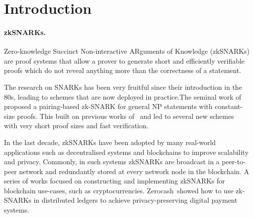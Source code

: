 %
%


\section{Introduction}


\paragraph{zkSNARKs.}

Zero-knowledge Succinct Non-interactive ARguments of Knowledge (zkSNARKs) are  proof systems that allow a prover to generate
short and efficiently verifiable proofs which do not reveal anything more than the correctness of a statement.  

The research on SNARKs has been very fruitful since their introduction in the 80s, leading to schemes that are now deployed in practice.The seminal work of~\cite{EC:GGPR13} proposed a pairing-based zk-SNARK for general NP statements with constant-size proofs. This built on previous works of~\cite{IKO07,AC:Groth10a,TCC:Lipmaa12} and led to several new schemes~\cite{TCC:BCIOP13,SP:PHGR13,C:BCGTV13,AC:Lipmaa13,USENIX:BCTV14,EC:Groth16} with very short proof sizes and fast verification. 

In the last decade, zkSNARKs have been adopted by many real-world applications such as decentralised systems and blockchains to improve scalability and privacy. 
Commonly, in such systems zkSNARKs are broadcast in a peer-to-peer network and redundantly stored at every network node in the blockchain.
A series of works focused on constructing and implementing zkSNARKs for blockchain use-cases, such as cryptocurrencies. Zerocash~\cite{SP:BCGGMT14}showed how to use zk-SNARKs in distributed ledgers to achieve privacy-preserving digital payment systems. 
  
